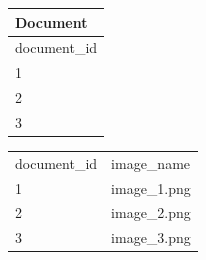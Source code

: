 \begin{table}

    \center

    \begin{tabular}{ l }
        \rowcolor{\dustRowHead}
        \textbf{Document}\\\hline
        document\_id\\\hline
        1\\
        2\\
        3\\
    \end{tabular}
    \quad
    \begin{tabular}{ l | l }
        \rowcolor{\dustRowHead}
        \multicolumn{2}{ c }{\textbf{Product}}\\\hline
        document\_id    & image\_name\\\hline
        1               & image\_1.png\\
        2               & image\_2.png\\
        3               & image\_3.png\\
    \end{tabular}

    ~\\


\end{table}
